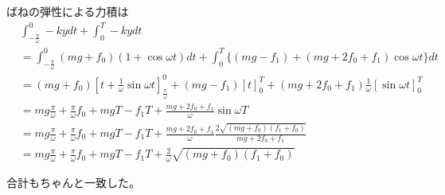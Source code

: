 \documentclass[a4paper,11pt]{jsarticle}
\begin{document}
ばねの弾性による力積は
\begin{align}
  & \int_{-\frac{\pi}{\omega}}^0 -ky dt
  + \int_0^T -ky dt
  \\
  &= \int_{-\frac{\pi}{\omega}}^0 (mg + f_0)( 1 + \cos \omega t ) dt
  + \int_0^T \Big\{ (mg-f_1) + (mg + 2f_0 + f_1)\cos \omega t\Big\} dt
  \\
  &= (mg + f_0)\left[ t + \frac{1}{\omega} \sin \omega t\right]_{\frac{\pi}{\omega}}^0
  + (mg - f_1)\left[ t \right]_0^T
  + (mg + 2f_0 + f_1) \frac{1}{\omega} \left[ \sin \omega t \right]_0^T
  \\
  &= mg\frac{\pi}{\omega} + \frac{\pi}{\omega} f_0
  + mgT - f_1 T
  + \frac{mg + 2f_0 + f_1}{\omega} \sin \omega T
  \\
  &= mg\frac{\pi}{\omega} + \frac{\pi}{\omega} f_0
  + mgT - f_1 T
  + \frac{mg + 2f_0 + f_1}{\omega} \frac{2\sqrt{(mg + f_0)(f_1+f_0)}}{mg + 2f_0 + f_1}
  \\
  &= mg\frac{\pi}{\omega} + \frac{\pi}{\omega} f_0
  + mgT - f_1 T
  + \frac{2}{\omega} \sqrt{(mg + f_0)(f_1+f_0)}
\end{align}

合計もちゃんと一致した。
\end{document}
